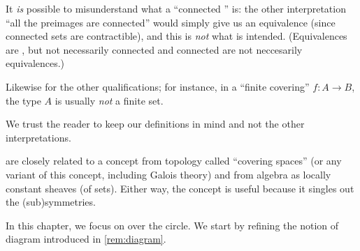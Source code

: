 \begin{remark}
  It \emph{is} possible to misunderstand what a ``connected \covering'' is:
the other interpretation ``all the preimages are connected''
would simply give us an equivalence (since connected sets are contractible),
and this is \emph{not} what is intended. (Equivalences are \coverings,
but not necessarily connected \coverings and connected \coverings are not neccesarily equivalences.)

Likewise for the other qualifications; for instance, in a ``finite covering'' $f:A\to B$,
the type $A$ is usually \emph{not} a finite set.

We trust the reader to keep our definitions in mind and not the other interpretations.
\end{remark}


\begin{remark}
  \Coverings are closely related to a concept from topology called ``covering spaces''
(or any variant of this concept, including Galois theory) and from algebra as locally constant sheaves (of sets).
Either way, the concept is useful because it singles out the (sub)symmetries.
\end{remark}

In this chapter, we focus on \coverings over the circle.
We start by refining the notion of diagram introduced in
\cref{rem:diagram}.

